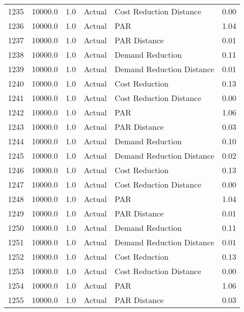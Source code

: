 \begin{longtable}{lrrllr}
1235 &      10000.0 &     1.0 &         Actual &    Cost Reduction Distance &   0.00 \\
1236 &      10000.0 &     1.0 &         Actual &                        PAR &   1.04 \\
1237 &      10000.0 &     1.0 &         Actual &               PAR Distance &   0.01 \\
1238 &      10000.0 &     1.0 &         Actual &           Demand Reduction &   0.11 \\
1239 &      10000.0 &     1.0 &         Actual &  Demand Reduction Distance &   0.01 \\
1240 &      10000.0 &     1.0 &         Actual &             Cost Reduction &   0.13 \\
1241 &      10000.0 &     1.0 &         Actual &    Cost Reduction Distance &   0.00 \\
1242 &      10000.0 &     1.0 &         Actual &                        PAR &   1.06 \\
1243 &      10000.0 &     1.0 &         Actual &               PAR Distance &   0.03 \\
1244 &      10000.0 &     1.0 &         Actual &           Demand Reduction &   0.10 \\
1245 &      10000.0 &     1.0 &         Actual &  Demand Reduction Distance &   0.02 \\
1246 &      10000.0 &     1.0 &         Actual &             Cost Reduction &   0.13 \\
1247 &      10000.0 &     1.0 &         Actual &    Cost Reduction Distance &   0.00 \\
1248 &      10000.0 &     1.0 &         Actual &                        PAR &   1.04 \\
1249 &      10000.0 &     1.0 &         Actual &               PAR Distance &   0.01 \\
1250 &      10000.0 &     1.0 &         Actual &           Demand Reduction &   0.11 \\
1251 &      10000.0 &     1.0 &         Actual &  Demand Reduction Distance &   0.01 \\
1252 &      10000.0 &     1.0 &         Actual &             Cost Reduction &   0.13 \\
1253 &      10000.0 &     1.0 &         Actual &    Cost Reduction Distance &   0.00 \\
1254 &      10000.0 &     1.0 &         Actual &                        PAR &   1.06 \\
1255 &      10000.0 &     1.0 &         Actual &               PAR Distance &   0.03 \\

\end{longtable}
